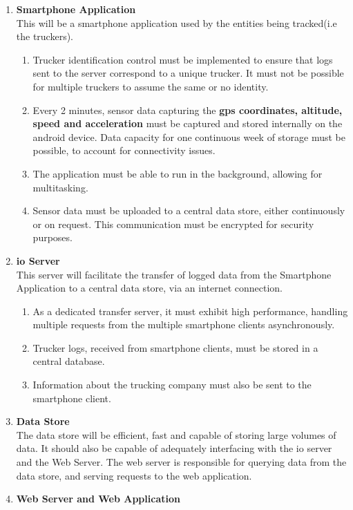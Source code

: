 \begin{enumerate}
\item \textbf{Smartphone Application}\\
    This will be a smartphone application used by the entities being tracked(i.e the truckers).
    \begin{enumerate}
        \item Trucker identification control must be implemented to ensure that logs sent to the server correspond to a unique trucker. It must not be possible for multiple truckers to assume the same or no identity.
        \item Every 2 minutes, sensor data capturing the \textbf{\ac{gps} coordinates, altitude, speed and acceleration} must be captured and stored internally on the android device. 
        Data capacity for one continuous week of storage must be possible, to account for connectivity issues.
        \item The application must be able to run in the background, allowing for multitasking.
        \item Sensor data must be uploaded to a central data store, either continuously or on request. This communication must be encrypted for security purposes.
    \end{enumerate}
\item \textbf{\ac{io} Server}\\
This server will facilitate the transfer of logged data from the Smartphone Application to a central data store, via an internet connection. 
    \begin{enumerate}
        \item As a dedicated transfer server, it must exhibit high performance, handling multiple requests from the multiple smartphone clients asynchronously.
        \item Trucker logs, received from smartphone clients, must be stored in a central database.
        \item Information about the trucking company must also be sent to the smartphone client.
    \end{enumerate}
\item \textbf{Data Store}\\
The data store will be efficient, fast and capable of storing large volumes of data.
It should also be capable of adequately interfacing with the \ac{io} server and the Web Server.
The web server is responsible for querying data from the data store, and serving requests to the web application.
\item \textbf{Web Server and Web Application}\\

\end{enumerate}
